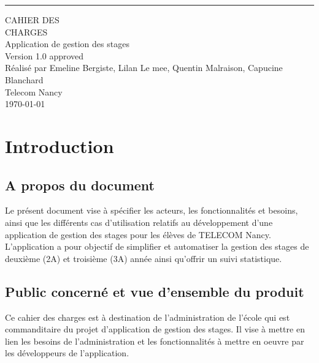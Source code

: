 \documentclass{scrreprt}
\date{}
\def\myversion{1.0 }
\begin{document}
\begin{flushright}
    \rule{16cm}{5pt}\vskip1cm
	\centering
    \begin{bfseries}
        \Huge{CAHIER DES\\ CHARGES}\\
        \vspace{1.9cm}
        Application de gestion des stages\\
        \vspace{1.9cm}
        \LARGE{Version \myversion approved}\\
        \vspace{1.9cm}
        Réalisé par Emeline Bergiste, Lilan Le mee, Quentin Malraison, Capucine Blanchard\\
        \vspace{1.9cm}
        Telecom Nancy\\
        \vspace{2.9cm}
        \today\\
    \end{bfseries}

\end{flushright}

\tableofcontents

\chapter{Introduction}

\section{A propos du document}
Le présent document vise à spécifier les acteurs, les fonctionnalités et besoins, ainsi que les différents cas d’utilisation relatifs au développement d’une application de gestion des stages pour les élèves de TELECOM Nancy. L’application a pour objectif de simplifier et automatiser la gestion des stages de deuxième (2A) et troisième (3A) année ainsi qu’offrir un suivi statistique.

\section{Public concerné et vue d’ensemble du produit}
Ce cahier des charges est à destination de l’administration de l’école qui est commanditaire du projet d’application de gestion des stages. Il vise à mettre en lien les besoins de l’administration et les fonctionnalités à mettre en oeuvre par les développeurs de l’application. 
\end{document}
